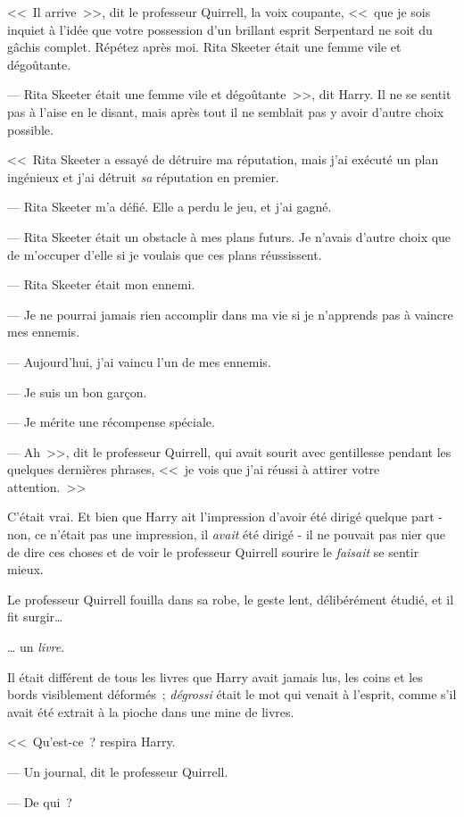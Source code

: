 <<~Il arrive~>>, dit le professeur Quirrell, la voix coupante, <<~que je sois inquiet à l'idée que votre possession d'un brillant esprit Serpentard ne soit du gâchis complet. Répétez après moi. Rita Skeeter était une femme vile et dégoûtante.

--- Rita Skeeter était une femme vile et dégoûtante~>>, dit Harry. Il ne se sentit pas à l'aise en le disant, mais après tout il ne semblait pas y avoir d'autre choix possible.

<<~Rita Skeeter a essayé de détruire ma réputation, mais j'ai exécuté un plan ingénieux et j'ai détruit \emph{sa} réputation en premier.

--- Rita Skeeter m'a défié. Elle a perdu le jeu, et j'ai gagné.

--- Rita Skeeter était un obstacle à mes plans futurs. Je n'avais d'autre choix que de m'occuper d'elle si je voulais que ces plans réussissent.

--- Rita Skeeter était mon ennemi.

--- Je ne pourrai jamais rien accomplir dans ma vie si je n'apprends pas à vaincre mes ennemis.

--- Aujourd'hui, j'ai vaincu l'un de mes ennemis.

--- Je suis un bon garçon.

--- Je mérite une récompense spéciale.

--- Ah~>>, dit le professeur Quirrell, qui avait sourit avec gentillesse pendant les quelques dernières phrases, <<~je vois que j'ai réussi à attirer votre attention.~>>

C'était vrai. Et bien que Harry ait l'impression d'avoir été dirigé quelque part - non, ce n'était pas une impression, il \emph{avait} été dirigé - il ne pouvait pas nier que de dire ces choses et de voir le professeur Quirrell sourire le \emph{faisait} se sentir mieux.

Le professeur Quirrell fouilla dans sa robe, le geste lent, délibérément étudié, et il fit surgir…

… un \emph{livre}.

Il était différent de tous les livres que Harry avait jamais lus, les coins et les bords visiblement déformés~; \emph{dégrossi} était le mot qui venait à l'esprit, comme s'il avait été extrait à la pioche dans une mine de livres.

<<~Qu'est-ce~? respira Harry.

--- Un journal, dit le professeur Quirrell.

--- De qui~?

